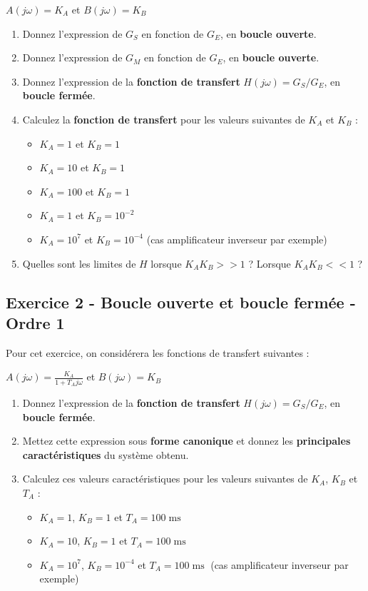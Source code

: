 \documentclass[a4paper,11pt,twoside]{book} %
\begin{document}
$A(j \omega) = K_A$ et $B(j \omega) = K_B$


\begin{enumerate}
	\item Donnez l'expression de $G_S$ en fonction de $G_E$, en \textbf{boucle ouverte}.
	\item Donnez l'expression de $G_M$ en fonction de $G_E$, en \textbf{boucle ouverte}.
		
	\item Donnez l'expression de la \textbf{fonction de transfert} $H(j \omega) = G_S / G_E$, en \textbf{boucle fermée}.
	\item Calculez la \textbf{fonction de transfert} pour les valeurs suivantes de $K_A$ et $K_B$ :
	\begin{itemize}
		\item $K_A = 1$ et $K_B = 1$
		\item $K_A = 10$ et $K_B = 1$
		\item $K_A = 100$ et $K_B = 1$
		\item $K_A = 1$ et $K_B = 10^{-2}$
		\item $K_A = 10^7$ et $K_B = 10^{-4}$ (cas amplificateur inverseur par exemple)
	\end{itemize}
	\item Quelles sont les limites de $H$ lorsque $K_A K_B >> 1$ ? Lorsque $K_A K_B << 1$ ?
\end{enumerate}

\subsection{Exercice 2 - Boucle ouverte et boucle fermée - Ordre 1}

Pour cet exercice, on considérera les fonctions de transfert suivantes : 

$A(j \omega) = \frac{K_A}{1 + T_A j \omega}$ et $B(j \omega) = K_B$

\begin{enumerate}
	\item Donnez l'expression de la \textbf{fonction de transfert} $H(j \omega) = G_S / G_E$, en \textbf{boucle fermée}. 
	\item Mettez cette expression sous \textbf{forme canonique} et donnez les \textbf{principales caractéristiques} du système obtenu.
	\item Calculez ces valeurs caractéristiques pour les valeurs suivantes de $K_A$, $K_B$ et $T_A$ :
	\begin{itemize}
		\item $K_A = 1$, $K_B = 1$ et $T_A = 100\operatorname{ms}$
		\item $K_A = 10$, $K_B = 1$ et $T_A = 100\operatorname{ms}$
		\item $K_A = 10^7$, $K_B = 10^{-4}$ et $T_A = 100\operatorname{ms}$ (cas amplificateur inverseur par exemple)
	\end{itemize}
\end{enumerate}
\end{document}
